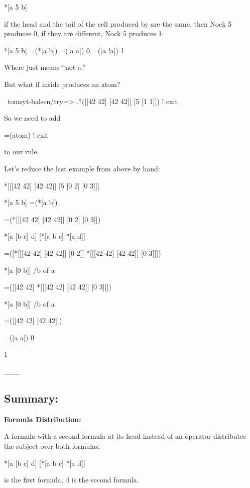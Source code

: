 \begin{code}
*[a 5 b] 
\end{code}
if the head and the tail of the cell produced by \kode{*[a b]} are the same, then
Nock 5 produces 0, if they are different, Nock 5 produces 1:

\begin{code}
*[a 5 b]              =(*[a b])
=([a a])              0 
=([a !a])              1
\end{code}
Where  just means ``not a.''

But what if \kode{*[a b]} inside \kode{=(*[a b])} produces an atom?

\begin{code}
~tomsyt-balsen/try=> .*([[42 42] [42 42]] [5 [1 1]])    
! exit
\end{code}
So we need to add

\begin{code}
=(atom)              ! exit
\end{code}
to our rule. 

Let's reduce the last example from above by hand:

\begin{code}
*[[[42 42] [42 42]] [5 [0 2] [0 3]]]

    *[a 5 b]                =(*[a b])

=(*[[[42 42] [42 42]] [0 2] [0 3]])

    *[a [b c] d]            [*[a b c] *[a d]] 

=([*[[[42 42] [42 42]] [0 2]] *[[[42 42] [42 42]] [0 3]]])

    *[a [0 b]]               /b of a

=([[42 42] *[[[42 42] [42 42]] [0 3]]])

    *[a [0 b]]               /b of a

=([[42 42] [42 42]])

    =([a a])                 0 

1
\end{code}
\_\_\_

\subsection{Summary:}

\textbf{Formula Distribution:}

A formula with a second formula at its head instead of an operator distributes the subject over both formulas:
\begin{code}
*[a [b c] d]          [*[a b c] *[a d]]  
\end{code}
\kode{[b c]} is the first formula, d is the second formula.

